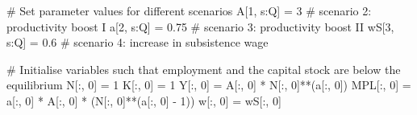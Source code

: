 \documentclass[
  letterpaper,
  DIV=11,
  numbers=noendperiod]{scrreprt}
\newenvironment{Shaded}{\begin{snugshade}}{\end{snugshade}}
\newcommand{\CommentTok}[1]{\textcolor[rgb]{0.37,0.37,0.37}{#1}}
\newcommand{\DecValTok}[1]{\textcolor[rgb]{0.68,0.00,0.00}{#1}}
\newcommand{\FloatTok}[1]{\textcolor[rgb]{0.68,0.00,0.00}{#1}}
\newcommand{\NormalTok}[1]{\textcolor[rgb]{0.00,0.23,0.31}{#1}}
\newcommand{\OperatorTok}[1]{\textcolor[rgb]{0.37,0.37,0.37}{#1}}
\begin{document}
\begin{tcolorbox}
\begin{Shaded}
\begin{Highlighting}[]
\CommentTok{\# Set parameter values for different scenarios}
\NormalTok{A[}\DecValTok{1}\NormalTok{, s:Q] }\OperatorTok{=} \DecValTok{3}  \CommentTok{\# scenario 2: productivity boost I}
\NormalTok{a[}\DecValTok{2}\NormalTok{, s:Q] }\OperatorTok{=} \FloatTok{0.75}  \CommentTok{\# scenario 3: productivity boost II}
\NormalTok{wS[}\DecValTok{3}\NormalTok{, s:Q] }\OperatorTok{=} \FloatTok{0.6}  \CommentTok{\# scenario 4: increase in subsistence wage}

\CommentTok{\# Initialise variables such that employment and the capital stock are below the equilibrium}
\NormalTok{N[:, }\DecValTok{0}\NormalTok{] }\OperatorTok{=} \DecValTok{1}
\NormalTok{K[:, }\DecValTok{0}\NormalTok{] }\OperatorTok{=} \DecValTok{1}
\NormalTok{Y[:, }\DecValTok{0}\NormalTok{] }\OperatorTok{=}\NormalTok{ A[:, }\DecValTok{0}\NormalTok{] }\OperatorTok{*}\NormalTok{ N[:, }\DecValTok{0}\NormalTok{]}\OperatorTok{**}\NormalTok{(a[:, }\DecValTok{0}\NormalTok{])}
\NormalTok{MPL[:, }\DecValTok{0}\NormalTok{] }\OperatorTok{=}\NormalTok{ a[:, }\DecValTok{0}\NormalTok{] }\OperatorTok{*}\NormalTok{ A[:, }\DecValTok{0}\NormalTok{] }\OperatorTok{*}\NormalTok{ (N[:, }\DecValTok{0}\NormalTok{]}\OperatorTok{**}\NormalTok{(a[:, }\DecValTok{0}\NormalTok{] }\OperatorTok{{-}} \DecValTok{1}\NormalTok{))}
\NormalTok{w[:, }\DecValTok{0}\NormalTok{] }\OperatorTok{=}\NormalTok{ wS[:, }\DecValTok{0}\NormalTok{]}


\end{Highlighting}
\end{Shaded}
\end{tcolorbox}
\end{document}
